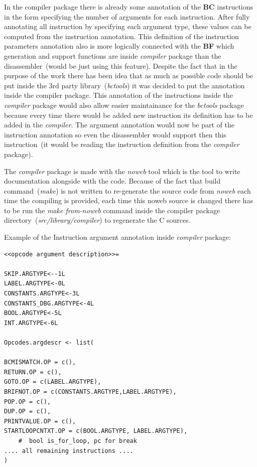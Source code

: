 \documentclass[thesis=M,english]{FITthesis}[2018/10/20]
\begin{document}
In the compiler package there is already some annotation of the \textbf{BC} instructions in the form specifying the number of arguments for each instruction. After fully annotating all instruction by specifying each argument type, these values can be computed from the instruction annotation. This definition of the instruction parameters annotation also is more logically connected with the \textbf{BF} which generation and support functions are inside \textit{compiler} package than the disassembler~(would be just using this feature). Despite the fact that in the purpose of the work there has been idea that as much as possible code should be put inside the 3rd party library~(\textit{bctools}) it was decided to put the annotation inside the compiler package. This annotation of the instructions inside the \textit{compiler} package would also allow easier maintainance for the \textit{bctools} package because every time there would be added new instruction its definition has to be added in the \textit{compiler}. The argument annotation would now be part of the instruction annotation so even the disassembler would support then this instruction~(it would be reading the instruction definition from the \textit{compiler} package).

The \textit{compiler} package is made with the \textit{noweb} tool which is the tool to write documentation alongside with the code. Because of the fact that build command~(\textit{make}) is not written to re-generate the source code from \textit{noweb} each time the compiling is provided, each time this noweb source is changed there has to be run the \textit{make from-noweb} command inside the compiler package directory~(\textit{src/library/compiler}) to regenerate the C sources.

Example of the Instruction argument annotation inside \textit{compiler} package:
\begin{lstlisting}
<<opcode argument description>>=

SKIP.ARGTYPE<--1L
LABEL.ARGTYPE<-0L
CONSTANTS.ARGTYPE<-3L
CONSTANTS_DBG.ARGTYPE<-4L
BOOL.ARGTYPE<-5L
INT.ARGTYPE<-6L

Opcodes.argdescr <- list(

BCMISMATCH.OP = c(),
RETURN.OP = c(),
GOTO.OP = c(LABEL.ARGTYPE),
BRIFNOT.OP = c(CONSTANTS.ARGTYPE,LABEL.ARGTYPE),
POP.OP = c(),
DUP.OP = c(),
PRINTVALUE.OP = c(),
STARTLOOPCNTXT.OP = c(BOOL.ARGTYPE, LABEL.ARGTYPE),
    #  bool is_for_loop, pc for break
.... all remaining instructions ....
)
\end{lstlisting}
\end{document}
